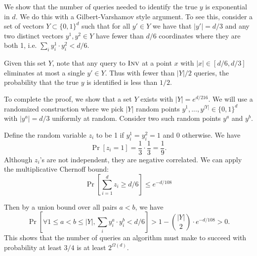 We show that the number of queries needed to identify the true $y$ is exponential in $d$. 
We do this with a Gilbert-Varshamov style argument.
To see this, consider a set of vectors $Y \subset \{0,1\}^d$ such that for all $y' \in Y$ we have that $|y'|=d/3$ and any two distinct vectors $y^1, y^2 \in Y$ have fewer than $d/6$ coordinates where they are both 1, i.e. $\sum_i y^1_i \cdot y^2_i < d/6$.

Given this set $Y$, note that any query to $\textsc{Inv}$ at a point $x$ with $|x| \in [d/6,d/3]$ eliminates at most a single $y' \in Y$.
Thus with fewer than $|Y|/2$ queries, the probability that the true $y$ is identified is less than $1/2$.

To complete the proof, we show that a set $Y$ exists with $|Y| = e^{d/216}$. We will use a randomized construction where we pick $|Y|$ random points $y^1,...,y^{|Y|} \in \{0,1\}^d$ with $|y^a|=d/3$ uniformly at random. Consider two such random points $y^a$ and $y^b$. 

Define the random variable $z_i$ to be 1 if $y^1_i = y^2_i = 1$ and 0 otherwise. We have
$$\Pr [z_i = 1] = \frac{1}{3} \cdot \frac{1}{3} = \frac{1}{9}.$$
Although $z_i$'s are not independent, they are negative correlated. We can apply the multiplicative Chernoff bound:
$$
\Pr\left[\sum_{i=1}^d z_i \ge d/6\right] \leq e^{-d/108}
$$

Then by a union bound over all pairs $a<b$, we have
\[
\Pr[\forall 1 \leq a < b \leq |Y|, \sum_i y^a_i \cdot y^b_i < d/6 ] > 1- \binom{|Y|}{2} \cdot e^{-d/108} > 0. 
\]
This shows that the number of queries an algorithm must make to succeed with probability at least $3/4$ is at least $2^{\Omega(d)}$.

